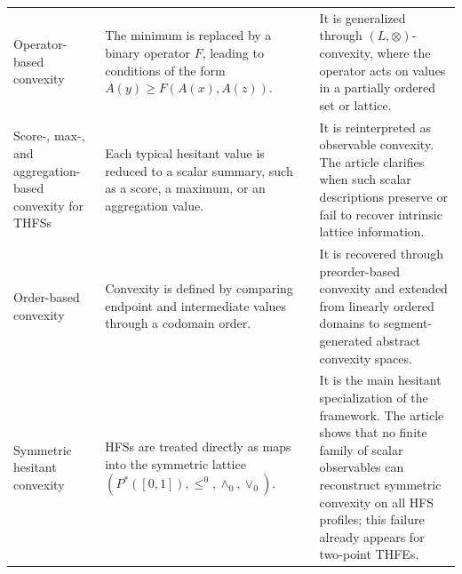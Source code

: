 \documentclass[11pt,a4paper]{article}
\begin{document}
\begin{table}[htbp]
\begin{tabularx}{\textwidth}{@{}
L{0.17\textwidth}
L{0.29\textwidth}
C{0.15\textwidth}
X
@{}}
Operator-based convexity &
The minimum is replaced by a binary operator \(F\), leading to conditions of the form \(A(y)\geq F(A(x),A(z))\). &
\citep{Diaz2017} &
It is generalized through \((L,\otimes)\)-convexity, where the operator acts on values in a partially ordered set or lattice. \\

\addlinespace

Score-, max-, and aggregation-based convexity for THFSs &
Each typical hesitant value is reduced to a scalar summary, such as a score, a maximum, or an aggregation value. &
\citep{RashidBeg2016,JanisMontesRencova2018,Huidobro2021} &
It is reinterpreted as observable convexity. The article clarifies when such scalar descriptions preserve or fail to recover intrinsic lattice information. \\

\addlinespace

Order-based convexity &
Convexity is defined by comparing endpoint and intermediate values through a codomain order. &
\citep{Huidobro2022,Huidobro2025} &
It is recovered through preorder-based convexity and extended from linearly ordered domains to segment-generated abstract convexity spaces. \\

\addlinespace

Symmetric hesitant convexity &
HFSs are treated directly as maps into the symmetric lattice \((P^*([0,1]),\leq^0,\wedge_0,\vee_0)\). &
\citep{JMNS22} &
It is the main hesitant specialization of the framework. The article shows that no finite family of scalar observables can reconstruct symmetric convexity on all HFS profiles; this failure already appears for two-point THFEs. \\

\bottomrule
\end{tabularx}
\end{table}



\smallskip
\end{document}
